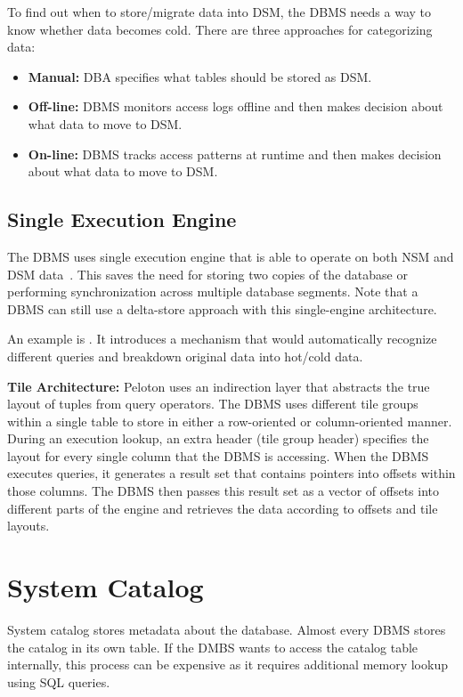 \documentclass[11pt]{article}
\begin{document}
To find out when to store/migrate data into DSM, the DBMS needs a way to know whether data becomes cold. There are three approaches for categorizing data:
\begin{itemize}
    \item \textbf{Manual:} DBA specifies what tables should be stored as DSM.
    \item \textbf{Off-line:} DBMS monitors access logs offline and then makes decision about what data to move to DSM.
    \item \textbf{On-line:} DBMS tracks access patterns at runtime and then makes decision about what data to move to DSM.
\end{itemize}

\subsection*{Single Execution Engine}
The DBMS uses single execution engine that is able to operate on both NSM and DSM 
data~\cite{p583-arulraj}. This saves the need for storing two copies of the database or performing synchronization across multiple database segments. Note that a DBMS can still use a delta-store approach with this single-engine architecture.

An example is . It introduces a mechanism that would automatically recognize different queries and breakdown original data into hot/cold data.

\textbf{Tile Architecture:} Peloton uses an indirection layer that abstracts the true layout of tuples from query operators. The DBMS uses different tile groups within a single table to store in either a row-oriented or column-oriented manner. During an execution lookup, an extra header (tile group header) specifies the layout for every single column that the DBMS is accessing. When the DBMS executes queries, it generates a result set that contains pointers into offsets within those columns. The DBMS then passes this result set as a vector of offsets into different parts of the engine and retrieves the data according to offsets and tile layouts.

\section{System Catalog} 
System catalog stores metadata about the database. Almost every DBMS stores the catalog in its own table. If the DMBS wants to access the catalog table internally, this process can be expensive as it requires additional memory lookup using SQL queries. 
\end{document}
